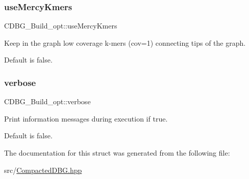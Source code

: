 \subsubsection{\texorpdfstring{use\+Mercy\+Kmers}{useMercyKmers}}
{\footnotesize\ttfamily C\+D\+B\+G\+\_\+\+Build\+\_\+opt\+::use\+Mercy\+Kmers}



Keep in the graph low coverage k-\/mers (cov=1) connecting tips of the graph. 

Default is false. \mbox{\label{structCDBG__Build__opt_ae904b922a07485a809f5bd89f9100225}} 
\subsubsection{\texorpdfstring{verbose}{verbose}}
{\footnotesize\ttfamily C\+D\+B\+G\+\_\+\+Build\+\_\+opt\+::verbose}



Print information messages during execution if true. 

Default is false. 

The documentation for this struct was generated from the following file\+:\begin{DoxyCompactItemize}
\item 
src/\hyperlink{CompactedDBG_8hpp}{Compacted\+D\+B\+G.\+hpp}\end{DoxyCompactItemize}
